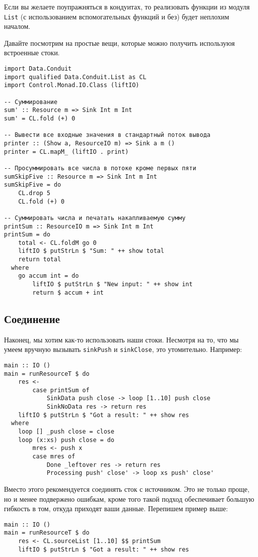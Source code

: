 Если вы желаете поупражняться в кондуитах, то реализовать функции из модуля
\lstinline'List' (с использованием вспомогательных функций и без) будет неплохим началом.

Давайте посмотрим на простые вещи, которые можно получить используюя встроенные стоки.
\begin{lstlisting}
import Data.Conduit
import qualified Data.Conduit.List as CL
import Control.Monad.IO.Class (liftIO)

-- Суммирование
sum' :: Resource m => Sink Int m Int
sum' = CL.fold (+) 0

-- Вывести все входные значения в стандартный поток вывода
printer :: (Show a, ResourceIO m) => Sink a m ()
printer = CL.mapM_ (liftIO . print)

-- Просуммировать все числа в потоке кроме первых пяти
sumSkipFive :: Resource m => Sink Int m Int
sumSkipFive = do
    CL.drop 5
    CL.fold (+) 0

-- Суммировать числа и печатать накапливаемую сумму
printSum :: ResourceIO m => Sink Int m Int
printSum = do
    total <- CL.foldM go 0
    liftIO $ putStrLn $ "Sum: " ++ show total
    return total
  where
    go accum int = do
        liftIO $ putStrLn $ "New input: " ++ show int
        return $ accum + int
\end{lstlisting}

\subsection{Соединение}
Наконец, мы хотим как-то использовать наши стоки. Несмотря на то, что мы умеем вручную вызывать
\lstinline|sinkPush| и \lstinline|sinkClose|, это утомительно. Например:
\begin{lstlisting}
main :: IO ()
main = runResourceT $ do
    res <-
        case printSum of
            SinkData push close -> loop [1..10] push close
            SinkNoData res -> return res
    liftIO $ putStrLn $ "Got a result: " ++ show res
  where
    loop [] _push close = close
    loop (x:xs) push close = do
        mres <- push x
        case mres of
            Done _leftover res -> return res
            Processing push' close' -> loop xs push' close'
\end{lstlisting}
Вместо этого рекомендуется соединять сток с источником. Это не только проще,
но и менее подвержено ошибкам, кроме того такой подход обеспечивает большую гибкость в том, откуда приходят ваши данные.
Перепишем пример выше:
\begin{lstlisting}
main :: IO ()
main = runResourceT $ do
    res <- CL.sourceList [1..10] $$ printSum
    liftIO $ putStrLn $ "Got a result: " ++ show res
\end{lstlisting}

